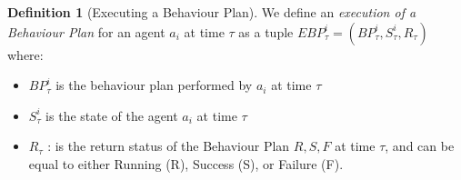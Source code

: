 \documentclass[journal]{IEEEtran}
\theoremstyle{definition}
\newtheorem{definition}{Definition}
\newcommand\patrizio[1]{\nb{Patrizio}{#1}}
\newcommand\ivano[1]{\nb{Ivano}{#1}}
\begin{document}
\begin{definition}[Executing a Behaviour Plan]
We define an \textit{execution of a Behaviour Plan} for an agent $a_i$ at time $\tau$ as a tuple $EBP^i_\tau=(BP^i_\tau, S^i_\tau,  R_\tau)$ where: 
\begin{itemize} 
\item $BP^i_\tau$ is the behaviour plan performed by $a_i$ at time $\tau$
\item $S^i_\tau$ is the state of the agent $a_i$ at time $\tau$ 
\item $R_\tau$ : is the return status of the Behaviour Plan ${R, S, F}$ at time $\tau$, and can be equal to either Running (R), Success (S), or Failure (F).
\end{itemize}
\end{definition}
\end{document}
